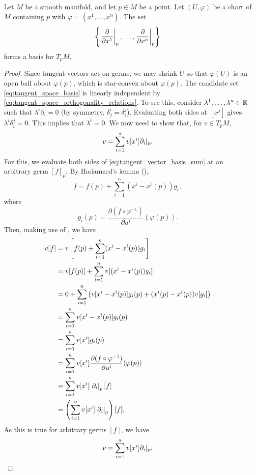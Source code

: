 \documentclass[a4paper,12pt]{article}
\begin{document}
\begin{proposition}\label{prop:tangent_space_basis_and_dimension}
    Let $M$ be a smooth manifold, and let $p \in M$ be a point.
    Let $(U, \varphi)$ be a chart of $M$ containing $p$ with $\varphi = (x^1, \ldots, x^n)$.
    The set
    \begin{equation}\label{eq:tangent_space_basis}
        \left\{\eval{\frac{\partial}{\partial x^1}}{p}, \ldots, \eval{\frac{\partial}{\partial x^n}}{p}\right\}
    \end{equation}
    forms a basis for $T_p M$.
\end{proposition}
\begin{proof}
    Since tangent vectors act on germs, we may shrink $U$ so that $\varphi(U)$ is an open ball about $\varphi(p)$, which is star-convex about $\varphi(p)$.
    The candidate set \eqref{eq:tangent_space_basis} is linearly independent by \eqref{eq:tangent_space_orthogonality_relations}.
    To see this, consider $\lambda^1, \ldots, \lambda^n \in \mathbb{R}$ such that $\lambda^i\partial_i = 0$ (by symmetry, $\delta^i_j = \delta^j_i$).
    Evaluating both sides at $[x^j]$ gives $\lambda^i\delta^j_i = 0$.
    This implies that $\lambda^i = 0$.
    We now need to show that, for $v \in T_p M$,
    \begin{equation}\label{eq:tangent_vector_basis_sum}
        v = \sum_{i=1}^n v[x^i] \eval*{\partial_i}{p}.
    \end{equation}
    For this, we evaluate both sides of \eqref{eq:tangent_vector_basis_sum} at an arbitrary germ $[f]_p$.
    By Hadamard's lemma (),
    \begin{equation*}
        f = f(p) + \sum_{i=1}^n(x^i - x^i(p))g_i,
    \end{equation*}
    where
    \begin{equation*}
        g_i(p) = \frac{\partial (f \circ \varphi^{-1})}{\partial u^i}(\varphi(p)).
    \end{equation*}
    Then, making use of , we have
    \begin{align*}
        v[f] &= v\left[f(p) + \sum_{i=1}^n (x^i - x^i(p)) g_i\right] \\
        &= v[f(p)] + \sum_{i=1}^n v[(x^i - x^i(p)) g_i] \\
        &= 0 + \sum_{i=1}^n \left(v[x^i - x^i(p)] g_i(p) + (x^i(p) - x^i(p))v[g_i]\right) \\
        &= \sum_{i=1}^n v[x^i - x^i(p)]g_i(p) \\
        &= \sum_{i=1}^n v[x^i] g_i(p) \\
        &= \sum_{i=1}^n v[x^i] \frac{\partial (f \circ \varphi^{-1})}{\partial u^i}(\varphi(p)) \\
        &= \sum_{i=1}^n v[x^i] \eval{\partial_i}{p} [f] \\
        &= \left(\sum_{i=1}^n v[x^i] \eval{\partial_i}{p}\right) [f].
    \end{align*}
    As this is true for arbitrary germs $[f]$, we have
    \begin{equation*}
        v = \sum_{i=1}^n v[x^i] \eval*{\partial_i}{p}. \qedhere
    \end{equation*}
\end{proof}
\end{document}
